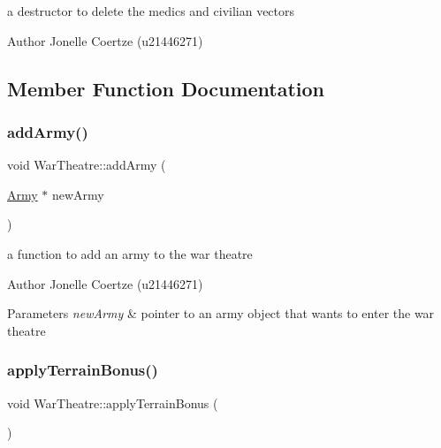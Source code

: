 a destructor to delete the medics and civilian vectors 

\begin{DoxyAuthor}{Author}
Jonelle Coertze (u21446271) 
\end{DoxyAuthor}


\subsection{Member Function Documentation}
\mbox{\label{class_war_theatre_ab51f972cc9b47859149f9132bcbcbaf5}} 
\subsubsection{\texorpdfstring{addArmy()}{addArmy()}}
{\footnotesize\ttfamily void War\+Theatre\+::add\+Army (\begin{DoxyParamCaption}\item[{\mbox{\hyperlink{class_army}{Army}} $\ast$}]{new\+Army }\end{DoxyParamCaption})}



a function to add an army to the war theatre 

\begin{DoxyAuthor}{Author}
Jonelle Coertze (u21446271) 
\end{DoxyAuthor}

\begin{DoxyParams}{Parameters}
{\em new\+Army} & pointer to an army object that wants to enter the war theatre \\
\hline
\end{DoxyParams}
\mbox{\label{class_war_theatre_a506466397ba9769d7128ea41a649af9e}} 
\subsubsection{\texorpdfstring{applyTerrainBonus()}{applyTerrainBonus()}}
{\footnotesize\ttfamily void War\+Theatre\+::apply\+Terrain\+Bonus (\begin{DoxyParamCaption}{ }\end{DoxyParamCaption})}



